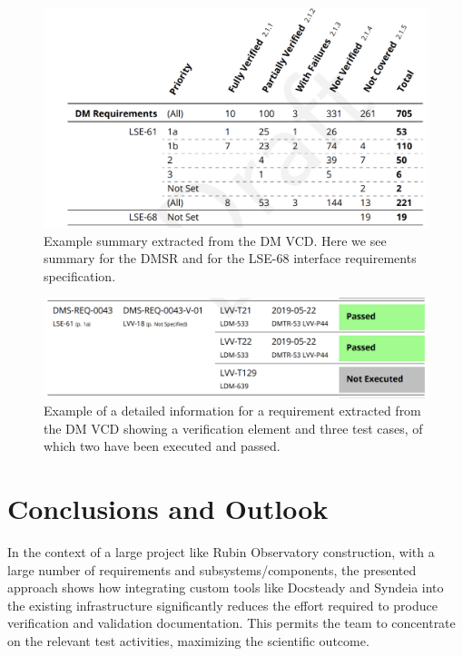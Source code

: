 \begin{figure}
\begin{center}
\includegraphics[width=\textwidth]{imgs/VCDsumm.png}
 \caption{Example summary extracted from the DM VCD. 
 Here we see summary for the DMSR \cite{LSE-61} and for the LSE-68 interface requirements specification\cite{LSE-68}.}
 \label{fig:vcdsum}
\end{center}
\end{figure}

\begin{figure}
\begin{center}
\includegraphics[width=\textwidth]{imgs/VCDdetail.png}
 \caption{Example of a detailed information for a requirement extracted from the DM VCD 
 showing a verification element and three test cases, of which two have been executed and passed.}
 \label{fig:vcddetail}
\end{center}
\end{figure}


\section{Conclusions and Outlook}
\label{sec:conclusions}

In the context of a large project like Rubin Observatory construction, with a large number of requirements
and subsystems/components, the presented approach shows how integrating custom tools like Docsteady
and Syndeia into the existing infrastructure significantly reduces the effort
required to produce verification and validation documentation.
This permits the team to concentrate on the relevant test activities, maximizing the scientific outcome.

